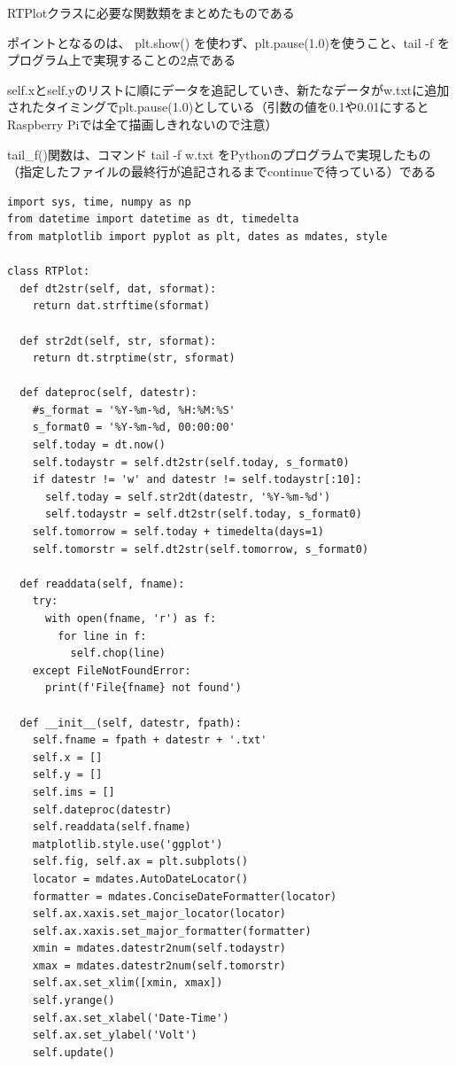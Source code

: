 \documentclass[12pt,a4paper,uplatex]{jsarticle}
\begin{document}
	RTPlotクラスに必要な関数類をまとめたものである
	
	ポイントとなるのは、 plt.show() を使わず、plt.pause(1.0)を使うこと、tail -f をプログラム上で実現することの2点である
	
	self.xとself.yのリストに順にデータを追記していき、新たなデータがw.txtに追加されたタイミングでplt.pause(1.0)としている（引数の値を0.1や0.01にするとRaspberry Piでは全て描画しきれないので注意）
	
	tail\_f()関数は、コマンド tail -f w.txt をPythonのプログラムで実現したもの（指定したファイルの最終行が追記されるまでcontinueで待っている）である

\begin{breakbox}%
	\begin{verbatim}
import sys, time, numpy as np
from datetime import datetime as dt, timedelta
from matplotlib import pyplot as plt, dates as mdates, style

class RTPlot:
  def dt2str(self, dat, sformat):
    return dat.strftime(sformat)

  def str2dt(self, str, sformat):
    return dt.strptime(str, sformat)

  def dateproc(self, datestr):
    #s_format = '%Y-%m-%d, %H:%M:%S'
    s_format0 = '%Y-%m-%d, 00:00:00'
    self.today = dt.now()
    self.todaystr = self.dt2str(self.today, s_format0)
    if datestr != 'w' and datestr != self.todaystr[:10]:
      self.today = self.str2dt(datestr, '%Y-%m-%d')
      self.todaystr = self.dt2str(self.today, s_format0)
    self.tomorrow = self.today + timedelta(days=1)
    self.tomorstr = self.dt2str(self.tomorrow, s_format0)

  def readdata(self, fname):
    try:
      with open(fname, 'r') as f:
        for line in f:
          self.chop(line)
    except FileNotFoundError:
      print(f'File{fname} not found')

  def __init__(self, datestr, fpath):
    self.fname = fpath + datestr + '.txt' 
    self.x = []
    self.y = []
    self.ims = []
    self.dateproc(datestr)
    self.readdata(self.fname)
    matplotlib.style.use('ggplot')
    self.fig, self.ax = plt.subplots()
    locator = mdates.AutoDateLocator()
    formatter = mdates.ConciseDateFormatter(locator)
    self.ax.xaxis.set_major_locator(locator)
    self.ax.xaxis.set_major_formatter(formatter)
    xmin = mdates.datestr2num(self.todaystr)
    xmax = mdates.datestr2num(self.tomorstr) 
    self.ax.set_xlim([xmin, xmax])
    self.yrange()
    self.ax.set_xlabel('Date-Time')
    self.ax.set_ylabel('Volt')
    self.update()


\end{verbatim}
\end{breakbox}
\end{document}
